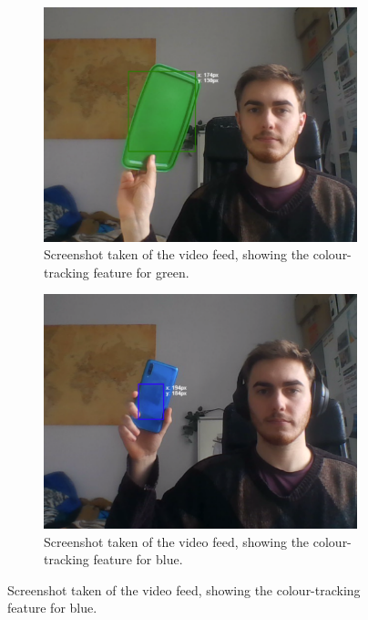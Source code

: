 \documentclass{l4proj}
\begin{document}
\begin{appendices}
\begin{figure}[!ht]
\begin{subfigure}{0.49\textwidth}
    \end{subfigure}
    \begin{subfigure}{0.49\textwidth}
        \centering
        \includegraphics[width=\textwidth]{images/colour-tracking-green.pdf}
        \caption{Screenshot taken of the video feed, showing the colour-tracking feature for green.}
        \label{fig:colour-tracking-green} 
    \end{subfigure}
    \begin{subfigure}{0.49\textwidth}
        \centering
        \includegraphics[width=\textwidth]{images/colour-tracking-blue.pdf}
        \caption{Screenshot taken of the video feed, showing the colour-tracking feature for blue.}
        \label{fig:colour-tracking-blue} 

\end{subfigure}
\end{figure}
\end{appendices}
\end{document}
